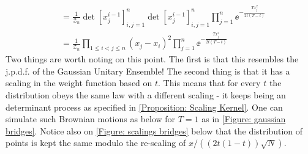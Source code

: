 \begin{exemplo}
\begin{align}
 		& =\frac{1}{\mathcal{Z}_n} \det{[x_{j}^{i-1}]}^{n}_{i,j=1} \det{[x_{j}^{i-1}]}^{n}_{i,j=1} \prod_{j=1}^{n} \ee^{-\frac{T x_j^2}{2t(T-t)}} \\
 		& =\frac{1}{\mathcal{Z}_n} \prod_{1\leq i < j \leq n} (x_j - x_i)^2 \prod_{j=1}^{n} \ee^{-\frac{T x_j^2}{2t(T-t)}}
 	\end{align}
 	Two things are worth noting on this point. The first is that this resembles the j.p.d.f. of the Gaussian Unitary Ensemble! The second thing is that it has a scaling in the weight function based on $t$. This means that for every $t$ the distribution obeys the same law with a different scaling - it keeps being an determinant process as specified in \autoref{Proposition: Scaling Kernel}. One can simulate such Brownian motions as below for $T = 1$ as in \autoref{Figure: gaussian bridges}. Notice also on \autoref{Figure: scalings bridges} below that the distribution of points is kept the same modulo the re-scaling of $x / ((2t(1-t))\sqrt{N})$.
 	\vspace{-0.4cm}
 	\begin{figure}[H]
 		\begin{subfigure}{0.3\textwidth}
 			\centering
 		\end{subfigure} \hspace{0.75cm}
 		\begin{subfigure}{0.3\textwidth}
 			\centering
 		\end{subfigure} \hfill

\end{figure}
\end{exemplo}
